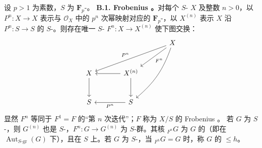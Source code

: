 设 $p>1$ 为素数，$S$ 为 $\mathbf F_p$-。
\textbf{B.1. Frobenius 。}对每个 $S$- $X$ 及整数 $n>0$，以 $P^n:X\to X$ 表示与 $\mathscr O_X$ 中的 $p^n$ 次幂映射对应的 $\mathbf F_p$-，以 $X^{(n)}$ 表示 $X$ 沿 $P^n:S\to S$ 的 $S$-。则存在唯一 $S$- $F^n:X\to X^{(n)}$ 使下图交换：
\[
\begin{tikzcd}[row sep=large,column sep=large]
&&X\arrow[dll,"P^n"']\arrow[dl,"F^n"]\arrow[ddl,bend left=15]\\
X\arrow[d]&X^{(n)}\arrow[l]\arrow[d]&\\
S&S\arrow[l,"P^n"]&
\end{tikzcd}
\]
显然 $F^n$ 等同于 $F^1=F$ 的“第 $n$ 次迭代”；$F$ 称为 $X/S$ 的 Frobenius 。
若 $G$ 为 $S$-，则 $G^{(n)}$ 也是 $S$-，$F^n:G\to G^{(n)}$ 为 $S$-群。其核 ${}_{F^n}G$ 为 $G$ 的（即在 $\operatorname{Aut}_{S\text{-gr}}(G)$ 下），且在 $S$ 上。若 $G$ 为 $S$-，当 ${}_{F^h}G=G$ 时，称 $G$ 的 $\leq h$。

